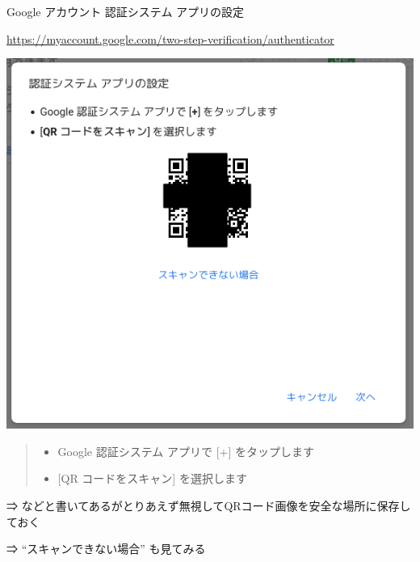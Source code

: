 \begin{frame}{Google アカウント 認証システム アプリの設定}

{\footnotesize\url{https://myaccount.google.com/two-step-verification/authenticator}}

\begin{center}
\includegraphics[width=0.3\hsize]{image202205/g-twostepverif-authenticator-1-1.png}
\end{center}

\begin{quote}
\begin{itemize}
 \item Google 認証システム アプリで [+] をタップします
 \item {[QR コードをスキャン] を選択します}
\end{itemize}
\end{quote}

⇒ などと書いてあるがとりあえず無視してQRコード画像を安全な場所に保存しておく

⇒ ``スキャンできない場合'' も見てみる

\end{frame}

